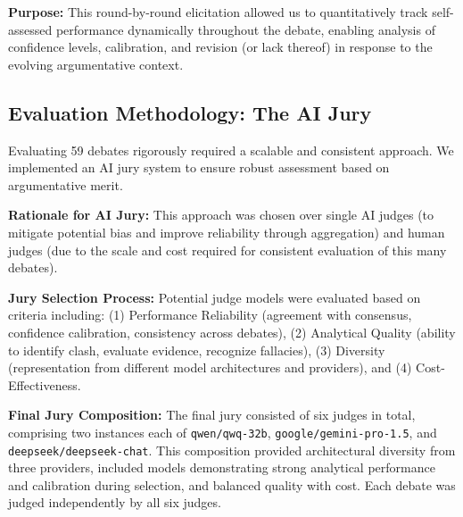\documentclass{article}
\begin{document}
\textbf{Purpose:} This round-by-round elicitation allowed us to quantitatively track self-assessed performance dynamically throughout the debate, enabling analysis of confidence levels, calibration, and revision (or lack thereof) in response to the evolving argumentative context.

\subsection{Evaluation Methodology: The AI Jury}
\label{subsec:ai_jury}

Evaluating 59 debates rigorously required a scalable and consistent approach. We implemented an AI jury system to ensure robust assessment based on argumentative merit.

\textbf{Rationale for AI Jury:} This approach was chosen over single AI judges (to mitigate potential bias and improve reliability through aggregation) and human judges (due to the scale and cost required for consistent evaluation of this many debates).

\textbf{Jury Selection Process:} Potential judge models were evaluated based on criteria including: (1) Performance Reliability (agreement with consensus, confidence calibration, consistency across debates), (2) Analytical Quality (ability to identify clash, evaluate evidence, recognize fallacies), (3) Diversity (representation from different model architectures and providers), and (4) Cost-Effectiveness.

\textbf{Final Jury Composition:} The final jury consisted of six judges in total, comprising two instances each of \texttt{qwen/qwq-32b}, \texttt{google/gemini-pro-1.5}, and \texttt{deepseek/deepseek-chat}. This composition provided architectural diversity from three providers, included models demonstrating strong analytical performance and calibration during selection, and balanced quality with cost. Each debate was judged independently by all six judges.
\end{document}
